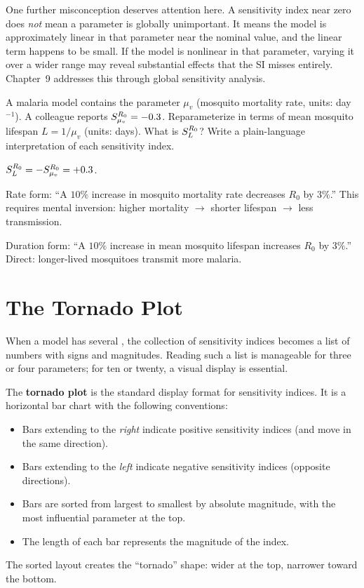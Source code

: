 One further misconception deserves attention here.
A sensitivity index near zero does \emph{not} mean a parameter is
globally unimportant. It means the model is approximately linear in
that parameter near the nominal value, and the linear term happens
to be small. If the model is nonlinear in that parameter, varying it
over a wider range may reveal substantial effects that the SI misses
entirely. Chapter~9 addresses this through global sensitivity analysis.

\begin{selfcheck}
A malaria model contains the parameter $\mu_v$ (mosquito mortality
rate, units: day$^{-1}$). A colleague reports $S_{\mu_v}^{R_0} = -0.3$.
Reparameterize in terms of mean mosquito lifespan $L = 1/\mu_v$
(units: days). What is $S_{L}^{R_0}$? Write a plain-language
interpretation of each sensitivity index.
\end{selfcheck}
\begin{scAnswer}
$S_{L}^{R_0} = -S_{\mu_v}^{R_0} = +0.3$.

Rate form: ``A $10\%$ increase in mosquito mortality rate decreases
$R_0$ by $3\%$.'' This requires mental inversion: higher mortality
$\to$ shorter lifespan $\to$ less transmission.

Duration form: ``A $10\%$ increase in mean mosquito lifespan increases
$R_0$ by $3\%$.'' Direct: longer-lived mosquitoes transmit more malaria.
\end{scAnswer}

\section{The Tornado Plot}
\label{sec:tornadoplot}

When a model has several \POIs, the collection of sensitivity indices
becomes a list of numbers with signs and magnitudes. Reading such a
list is manageable for three or four parameters; for ten or twenty,
a visual display is essential.

The \textbf{tornado plot} is the standard display format for
sensitivity indices. It is a horizontal bar chart with the following
conventions:
\begin{itemize}[nosep]
  \item Bars extending to the \emph{right} indicate positive sensitivity
        indices (\POI and \QOI move in the same direction).
  \item Bars extending to the \emph{left} indicate negative sensitivity
        indices (opposite directions).
  \item Bars are sorted from largest to smallest by absolute magnitude,
        with the most influential parameter at the top.
  \item The length of each bar represents the magnitude of the index.
\end{itemize}
The sorted layout creates the ``tornado'' shape: wider at the top,
narrower toward the bottom.

